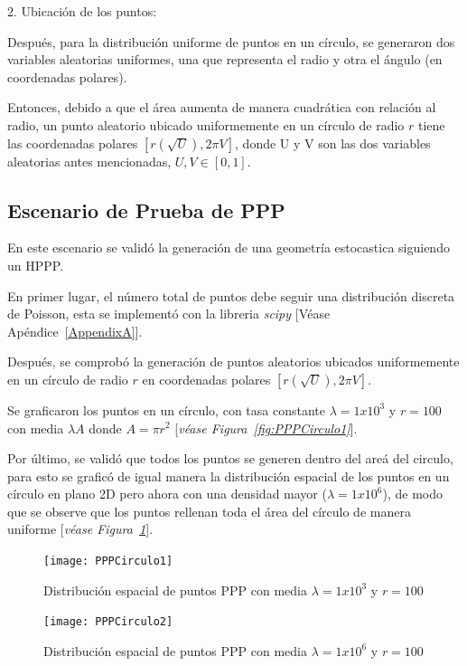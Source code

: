 2. Ubicación de los puntos:\newline

Después, para la distribución uniforme de puntos en un círculo, se generaron dos variables aleatorias uniformes, una que representa el radio y otra el ángulo (en coordenadas polares).\newline

Entonces, debido a que el área aumenta de manera cuadrática con relación al radio, un punto aleatorio ubicado uniformemente en un círculo de radio $r$ tiene las coordenadas polares $[r(\sqrt{U}), 2\pi V]$, donde U y V son las dos variables aleatorias antes mencionadas, $U, V \in{[0,1]}$.\newline

\subsection{Escenario de Prueba de PPP}

En este escenario se validó la generación de una geometría estocastica siguiendo un HPPP.\newline

En primer lugar, el número total de puntos debe seguir una distribución discreta de Poisson, esta se implementó con la libreria \textit{scipy} [Véase Apéndice~\ref{AppendixA}].\newline

Después, se comprobó la generación de puntos aleatorios ubicados uniformemente en un círculo de radio $r$ en coordenadas polares $[r(\sqrt{U}), 2\pi V]$.\newline

Se graficaron los puntos en un círculo, con tasa constante $\lambda = 1x10^{3}$ y $r = 100$ con media $\lambda A$ donde $A=\pi r^{2}$ [\textit{véase Figura~\ref{fig:PPPCirculo1}}].\newline

Por último, se validó que todos los puntos se generen dentro del areá del circulo, para esto se graficó de igual manera la distribución espacial de los puntos en un círculo en plano 2D pero ahora con una densidad mayor ($\lambda = 1x10^{6}$), de modo que se observe que los puntos rellenan toda el área del círculo de manera uniforme [\textit{véase Figura~\ref{fig:PPPCirculo2}}].\newline

\begin{figure}
    \centering
    \begin{minipage}{.45\linewidth}
      \texttt{[image: PPPCirculo1]}
      \caption[Distribución espacial de puntos PPP en un círculo 2D]{Distribución espacial de puntos PPP con media $\lambda = 1x10^{3}$ y $r = 100$}
      \label{fig:PPPCirculo1}
    \end{minipage}
    \hspace{.05\linewidth}
    \begin{minipage}{.45\linewidth}
      \texttt{[image: PPPCirculo2]}
      \caption[Distribución espacial de puntos PPP en un círculo 2D]{Distribución espacial de puntos PPP con media $\lambda = 1x10^{6}$ y $r = 100$}
      \label{fig:PPPCirculo2}
    \end{minipage}
\end{figure}

